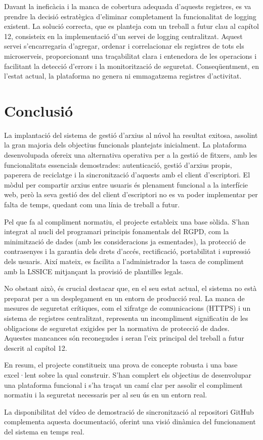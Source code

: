 \begin{itemize}
    Davant la ineficàcia i la manca de cobertura adequada d'aquests registres, es va prendre la decisió estratègica d'eliminar completament la funcionalitat de logging existent. La solució correcta, que es planteja com un treball a futur clau al capítol 12, consisteix en la implementació d'un servei de logging centralitzat. Aquest servei s'encarregaria d'agregar, ordenar i correlacionar els registres de tots els microserveis, proporcionant una traçabilitat clara i entenedora de les operacions i facilitant la detecció d'errors i la monitorització de seguretat. Conseqüentment, en l'estat actual, la plataforma no genera ni emmagatzema registres d'activitat.
\end{itemize}

\section{Conclusió}

La implantació del sistema de gestió d'arxius al núvol ha resultat exitosa, assolint la gran majoria dels objectius funcionals plantejats inicialment. La plataforma desenvolupada ofereix una alternativa operativa per a la gestió de fitxers, amb les funcionalitats essencials demostrades: autenticació, gestió d'arxius propis, paperera de reciclatge i la sincronització d'aquests amb el client d'escriptori. El mòdul per compartir arxius entre usuaris és plenament funcional a la interfície web, però la seva gestió des del client d'escriptori no es va poder implementar per falta de temps, quedant com una línia de treball a futur.

Pel que fa al compliment normatiu, el projecte estableix una base sòlida. S'han integrat al nucli del programari principis fonamentals del RGPD, com la minimització de dades (amb les consideracions ja esmentades), la protecció de contrasenyes i la garantia dels drets d'accés, rectificació, portabilitat i supressió dels usuaris. Així mateix, es facilita a l'administrador la tasca de compliment amb la LSSICE mitjançant la provisió de plantilles legals.

No obstant això, és crucial destacar que, en el seu estat actual, el sistema no està preparat per a un desplegament en un entorn de producció real. La manca de mesures de seguretat crítiques, com el xifratge de comunicacions (HTTPS) i un sistema de registres centralitzat, representa un incompliment significatiu de les obligacions de seguretat exigides per la normativa de protecció de dades. Aquestes mancances són reconegudes i seran l'eix principal del treball a futur descrit al capítol 12.

En resum, el projecte constitueix una prova de concepte robusta i una base excel·lent sobre la qual construir. S'han complert els objectius de desenvolupar una plataforma funcional i s'ha traçat un camí clar per assolir el compliment normatiu i la seguretat necessaris per al seu ús en un entorn real.

La disponibilitat del vídeo de demostració de sincronització al repositori GitHub complementa aquesta documentació, oferint una visió dinàmica del funcionament del sistema en temps real.
